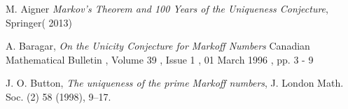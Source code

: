 \documentclass[12pt,a4paper]{amsart}
\def\ZZ{\mathbb{Z}}
\begin{document}



%
%
%


M. Aigner
\textit{Markov's Theorem and 100 Years of the Uniqueness Conjecture}, Springer( 2013)

A. Baragar,
\textit{On the Unicity Conjecture for Markoff Numbers}
Canadian Mathematical Bulletin , Volume 39 , Issue 1 , 01 March 1996 , pp. 3 - 9

J. O. Button, 
\textit{The uniqueness of the prime Markoff numbers},
 J. London Math. Soc.
(2) 58 (1998), 9–17.
\end{document}

